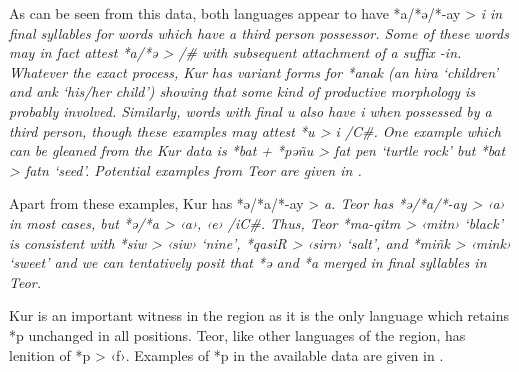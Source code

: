 As can be seen from this data,
both languages appear to have *a/*ə/*-ay > \it{i} in final syllables
for words which have a third person possessor.
Some of these words may in fact attest *a/*ə > {\0} /{\gap}{\#}
with subsequent attachment of a suffix \it{-in}.
Whatever the exact process,
Kur has variant forms for *anak (\it{an hira} ‘children’
and \it{ank} ‘his/her child’) showing that
some kind of productive morphology is probably involved.
Similarly, words with final \it{u} also have \it{i}
when possessed by a third person,
though these examples may attest *u > \it{i} /{\gap}C{\#}.
One example which can be gleaned from the Kur data is *bat
+ *pəñu > \it{fat pen} ‘turtle rock’ but *bat > \it{fatn} ‘seed'.
Potential examples from Teor are given in .


Apart from these examples,
Kur has *ə/*a/*-ay > \it{a}.
Teor has *ə/*a/*-ay > ‹a› in most cases,
but *ə/*a > ‹a›, ‹e› /iC{\gap}{\#}.
Thus, Teor *ma-qitm > ‹mitn› ‘black’ is consistent
with *siw > ‹siw› ‘nine’,
*qasiR > ‹sirn› ‘salt’,
and *miñk > ‹mink› ‘sweet’
and we can tentatively posit that *ə
and *a merged in final syllables in Teor.

Kur is an important witness in the region as it is the only language
which retains *p unchanged in all positions.
Teor, like other languages of the region,
has lenition of *p > ‹f›.
Examples of *p in the available data are given in .


